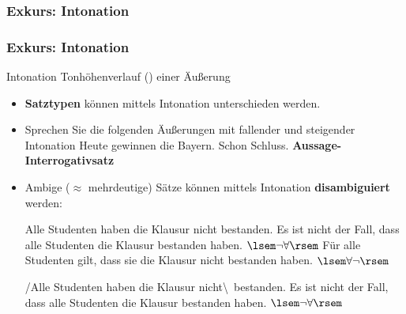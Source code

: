 \subsubsection{Exkurs: Intonation}

\begin{frame}
\frametitle{Exkurs: Intonation}

\begin{block}{Intonation}
Tonhöhenverlauf () einer Äußerung
\end{block}

\begin{itemize}
	\item \textbf{Satztypen} können mittels Intonation unterschieden werden.
	
	\item Sprechen Sie die folgenden Äußerungen mit fallender und steigender Intonation
	\eal 
	\ex Heute gewinnen die Bayern.
	\ex Schon Schluss.
        \zl
\pause
	\textbf{Aussage-} \vs \textbf{Interrogativsatz}	
	
\end{itemize}

\end{frame}




\begin{frame}

\begin{itemize}
	\item Ambige ($\approx$ mehrdeutige) Sätze können mittels Intonation  \textbf{disambiguiert} werden: 
	
	  \ea
          Alle Studenten haben die Klausur nicht bestanden.
          \z
        \eal
	\ex Es ist nicht der Fall, dass alle Studenten die Klausur bestanden haben. \hfill $\lsem \neg \forall \rsem$
	\ex Für alle Studenten gilt, dass sie die Klausur nicht bestanden haben. \hfill $\lsem \forall \neg \rsem$
        \zl
\pause 

\ea
/Alle Studenten haben die Klausur  nicht\textbackslash\ bestanden.
\z
\eal
\ex Es ist nicht der Fall, dass alle Studenten die Klausur bestanden haben. \hfill $\lsem \neg \forall \rsem$
	\zl

\end{itemize}

\end{frame}


